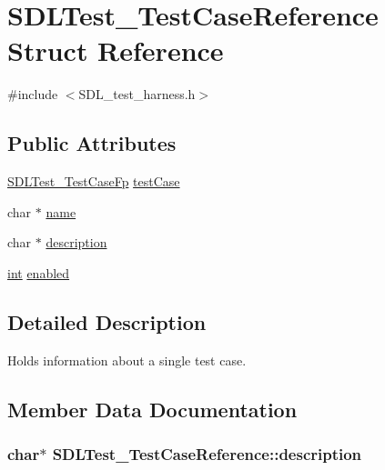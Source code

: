 \hypertarget{struct_s_d_l_test___test_case_reference}{}\section{S\+D\+L\+Test\+\_\+\+Test\+Case\+Reference Struct Reference}
\label{struct_s_d_l_test___test_case_reference}


{\ttfamily \#include $<$S\+D\+L\+\_\+test\+\_\+harness.\+h$>$}

\subsection*{Public Attributes}
\begin{DoxyCompactItemize}
\item 
\hyperlink{_s_d_l__test__harness_8h_ae1a62d8f725d57dc95faddcc5409afbb}{S\+D\+L\+Test\+\_\+\+Test\+Case\+Fp} \hyperlink{struct_s_d_l_test___test_case_reference_af9472f0c421a2845b540fc28fb30a3ef}{test\+Case}
\item 
char $\ast$ \hyperlink{struct_s_d_l_test___test_case_reference_aabd588c915c52fb13bcd0c71e071a604}{name}
\item 
char $\ast$ \hyperlink{struct_s_d_l_test___test_case_reference_a1ee6c8a2529fdfcd62bb1483c26be67d}{description}
\item 
\hyperlink{_s_d_l__thread_8h_a6a64f9be4433e4de6e2f2f548cf3c08e}{int} \hyperlink{struct_s_d_l_test___test_case_reference_a15168c85e38cae7557b4beb477ef6f9a}{enabled}
\end{DoxyCompactItemize}


\subsection{Detailed Description}
Holds information about a single test case. 

\subsection{Member Data Documentation}
\subsubsection[{\texorpdfstring{description}{description}}]{\setlength{\rightskip}{0pt plus 5cm}char$\ast$ S\+D\+L\+Test\+\_\+\+Test\+Case\+Reference\+::description}\hypertarget{struct_s_d_l_test___test_case_reference_a1ee6c8a2529fdfcd62bb1483c26be67d}{}\label{struct_s_d_l_test___test_case_reference_a1ee6c8a2529fdfcd62bb1483c26be67d}
